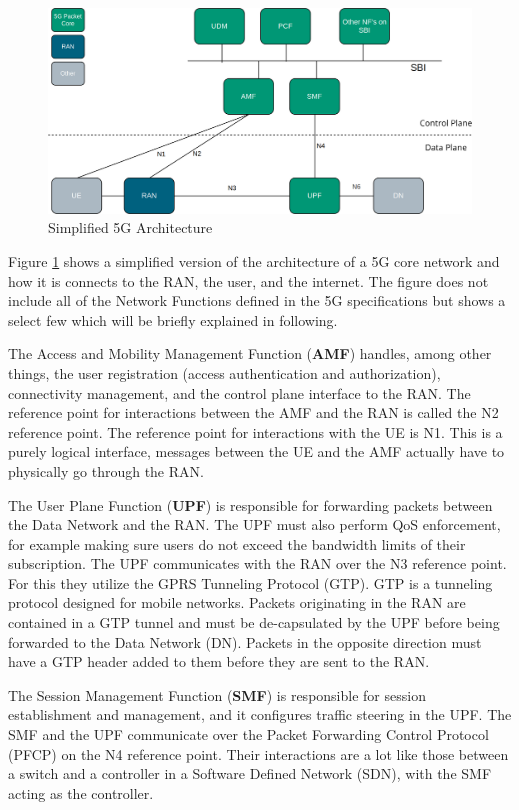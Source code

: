 \begin{figure}[ht]
    \centering
	\includegraphics[width=\linewidth]{fig/core.png}
	\caption{Simplified 5G Architecture}
	\label{fig:core}
\end{figure} 

Figure \ref{fig:core} shows a simplified version of the architecture of a 5G core network and how it is connects to the RAN, the user, and the internet. The figure does not include all of the Network Functions defined in the 5G specifications but shows a select few which will be briefly explained in following.

The Access and Mobility Management Function (\textbf{AMF}) handles, among other things, the user registration (access authentication and authorization), connectivity management, and the control plane interface to the RAN. The reference point for interactions between the AMF and the RAN is called the N2 reference point. The reference point for interactions with the UE is N1. This is a purely logical interface, messages between the UE and the AMF actually have to physically go through the RAN.

The User Plane Function (\textbf{UPF}) is responsible for forwarding packets between the Data Network and the RAN. The UPF must also perform QoS enforcement, for example making sure users do not exceed the bandwidth limits of their subscription. The UPF communicates with the RAN over the N3 reference point. For this they utilize the GPRS Tunneling Protocol (GTP). GTP is a tunneling protocol designed for mobile networks. Packets originating in the RAN are contained in a GTP tunnel and must be de-capsulated by the UPF before being forwarded to the Data Network (DN). Packets in the opposite direction must have a GTP header added to them before they are sent to the RAN.

The Session Management Function (\textbf{SMF}) is responsible for session establishment and management, and it configures traffic steering in the UPF. The SMF and the UPF communicate over the Packet Forwarding Control Protocol (PFCP) on the N4 reference point. Their interactions are a lot like those between a switch and a controller in a Software Defined Network (SDN), with the SMF acting as the controller.

